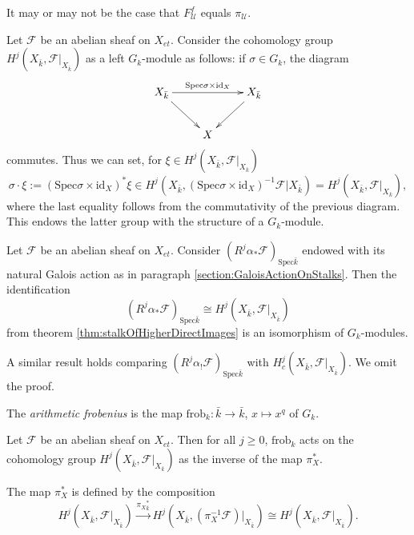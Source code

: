 \begin{remark}
It may or may not be the case that $F^f_\mathcal{U}$ equals $\pi_\mathcal{U}$.
\end{remark}

Let $\mathcal{F}$ be an abelian sheaf on $X_{et}$. Consider the cohomology 
group $H^j (X_{\bar k}, \mathcal{F}|_{X_{\bar k}})$ as a left $G_k$-module as 
follows: if $\sigma \in G_k$, the diagram 
$$
\xymatrix{
X_{\bar k} \ar[rd] \ar^{\text{Spec} \sigma \times \text{id}_X}[rr] && X_{\bar 
k} \ar[ld]\\
& X
}
$$
commutes. Thus we can set, for $\xi \in H^j (X_{\bar k}, \mathcal{F}|_{X_{\bar 
k}})$
$$
\sigma \cdot \xi := (\text{Spec} \sigma \times \text{id}_X)^*\xi \in 
H^j(X_{\bar k}, (\text{Spec} \sigma \times \text{id}_X)^{-1} 
\mathcal{F}|{X_{\bar k}})
= H^j (X_{\bar k}, \mathcal{F}|_{X_{\bar k}}),
$$
where the last equality follows from the commutativity of the previous diagram. 
This endows the latter group with the structure of a $G_k$-module.

\begin{lemma}
Let $\mathcal{F}$ be an abelian sheaf on $X_{et}$. Consider 
$(R^j\alpha_*\mathcal{F})_{\text{Spec} \bar k}$ endowed with its natural Galois 
action as in paragraph \ref{section:GaloisActionOnStalks}. Then the 
identification
$$
(R^j\alpha_*\mathcal{F})_{\text{Spec} \bar k} \cong H^j (X_{\bar k}, 
\mathcal{F}|_{X_{\bar k}})
$$
from theorem \ref{thm:stalkOfHigherDirectImages} is an isomorphism of 
$G_k$-modules.
\end{lemma}

A similar result holds comparing $(R^j\alpha_!\mathcal{F})_{\text{Spec} \bar 
k}$ with $H^j_c (X_{\bar k}, \mathcal{F}|_{X_{\bar k}})$. We omit the proof.

\begin{definition}
The {\it arithmetic frobenius} is the map $\text{frob}_k : \bar k \to \bar k$, 
$x \mapsto x^q$  of $G_k$.
\end{definition}

\begin{theorem}
Let $\mathcal{F}$ be an abelian sheaf on $X_{et}$. Then for all $j\geq 0$, 
$\text{frob}_k$ acts on the cohomology group $H^j(X_{\bar k}, 
\mathcal{F}|_{X_{\bar k}})$ as the inverse of the map $\pi_X^*$.
\end{theorem}

The map $\pi_X^*$ is defined by the composition
$$
H^j(X_{\bar k}, \mathcal{F}|_{X_{\bar k}}) \xrightarrow{{\pi_X}_{\bar k}^*}
H^j(X_{\bar k}, (\pi_X^{-1} \mathcal{F})|_{X_{\bar k}}) \cong
H^j(X_{\bar k}, \mathcal{F}|_{X_{\bar k}}).
$$


